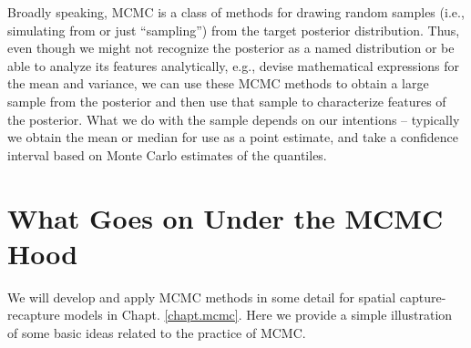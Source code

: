 Broadly speaking, MCMC is a class of methods for drawing random
samples
(i.e., simulating from or just ``sampling'') from the target posterior
distribution.  Thus, even though we might not recognize the posterior
as a named distribution or be able to analyze its features
analytically, e.g., devise mathematical expressions for the mean and
variance, we can use these MCMC methods to obtain a large sample from
the posterior and then use that sample to characterize features of the
posterior. What we do with the sample depends on our intentions --
typically we obtain the mean or median for use as a point estimate,
and take a confidence interval based on Monte Carlo estimates of the
quantiles. 

\section{What Goes on Under the MCMC Hood}

We will develop and apply MCMC methods in some detail for spatial
capture-recapture models in Chapt. \ref{chapt.mcmc}. Here we provide
a simple illustration of some basic ideas related to the practice of MCMC.


